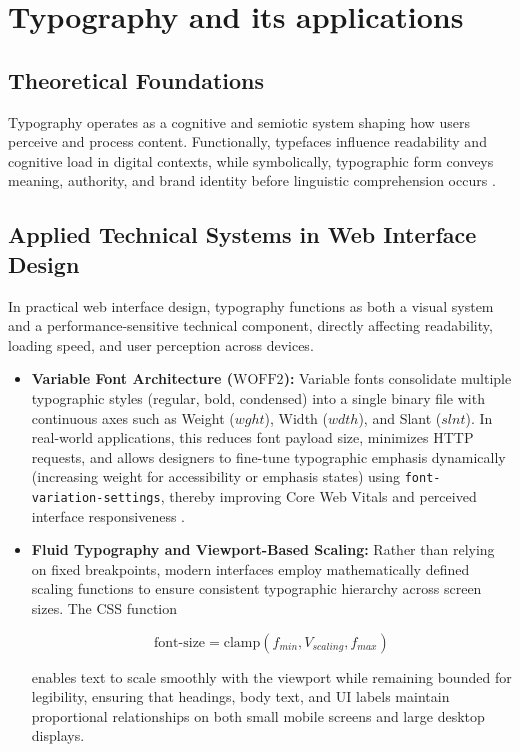 \section{Typography and its applications}
\subsection{Theoretical Foundations}
Typography operates as a cognitive and semiotic system shaping how users perceive and process content. Functionally, typefaces influence readability and cognitive load in digital contexts, while symbolically, typographic form conveys meaning, authority, and brand identity before linguistic comprehension occurs \cite{lidwell2010, bringhurst2013}.
\subsection{Applied Technical Systems in Web Interface Design}

In practical web interface design, typography functions as both a visual system and a performance-sensitive technical component, directly affecting readability, loading speed, and user perception across devices.

\begin{itemize}

    \item \textbf{Variable Font Architecture ($\text{WOFF2}$):} Variable fonts consolidate multiple typographic styles (regular, bold, condensed) into a single binary file with continuous axes such as Weight ($wght$), Width ($wdth$), and Slant ($slnt$). In real-world applications, this reduces font payload size, minimizes HTTP requests, and allows designers to fine-tune typographic emphasis dynamically (increasing weight for accessibility or emphasis states) using \texttt{font-variation-settings}, thereby improving Core Web Vitals and perceived interface responsiveness \cite{mdnVariableFonts}.

    \item \textbf{Fluid Typography and Viewport-Based Scaling:} Rather than relying on fixed breakpoints, modern interfaces employ mathematically defined scaling functions to ensure consistent typographic hierarchy across screen sizes. The CSS function

    \begin{equation}
        \text{font-size} = \text{clamp}(f_{min}, V_{scaling}, f_{max})
    \end{equation}

    enables text to scale smoothly with the viewport while remaining bounded for legibility, ensuring that headings, body text, and UI labels maintain proportional relationships on both small mobile screens and large desktop displays.

\end{itemize}


